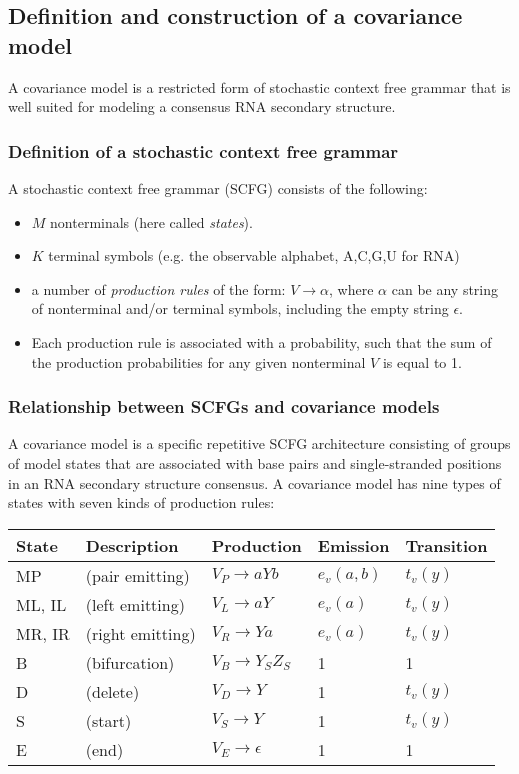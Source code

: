 \documentclass[11pt]{article}
\begin{document}
\subsection{Definition and construction of a covariance model}

A covariance model is a restricted form of stochastic context free
grammar that is well suited for modeling a consensus RNA secondary
structure.

\subsubsection{Definition of a stochastic context free grammar}

A stochastic context free grammar (SCFG) consists of the following:

\begin{itemize}
\item $M$ nonterminals (here called \emph{states}).
\item $K$ terminal symbols (e.g. the observable alphabet, {A,C,G,U} for RNA)
\item a number of \emph{production rules} of the form:
      $V \rightarrow \alpha$,
      where $\alpha$ can be any string of nonterminal and/or terminal
      symbols, including the empty string
      $\epsilon$.
\item Each production rule is associated with a probability, such that
      the sum of the production probabilities for any given
      nonterminal $V$ is equal to 1.
\end{itemize} 

\subsubsection{Relationship between SCFGs and covariance models}

A covariance model is a specific repetitive SCFG architecture
consisting of groups of model states that are associated with base
pairs and single-stranded positions in an RNA secondary structure
consensus. A covariance model has nine types of states with seven
kinds of production rules:

\begin{tabular}{lllll}
State  & Description             &  Production             & Emission & Transition\\ \hline
MP  & (pair emitting)           & $V_P \rightarrow a Y b$ & $e_v(a,b)$ & $t_v(y)$  \\
ML, IL & (left emitting)       & $V_L \rightarrow a Y$   & $e_v(a)$   & $t_v(y)$  \\
MR, IR & (right emitting)      & $V_R \rightarrow Y a$   & $e_v(a)$   & $t_v(y)$  \\
B &  (bifurcation)    & $V_B \rightarrow Y_S Z_S$  & 1     &     1     \\ \hline
D & (delete)         & $V_D \rightarrow Y$     &    1     &   $t_v(y)$  \\
S & (start)          & $V_S \rightarrow Y$     &    1     &   $t_v(y)$  \\
E & (end)            & $V_E \rightarrow \epsilon$ & 1     &     1     \\
\end{tabular}
\end{document}

